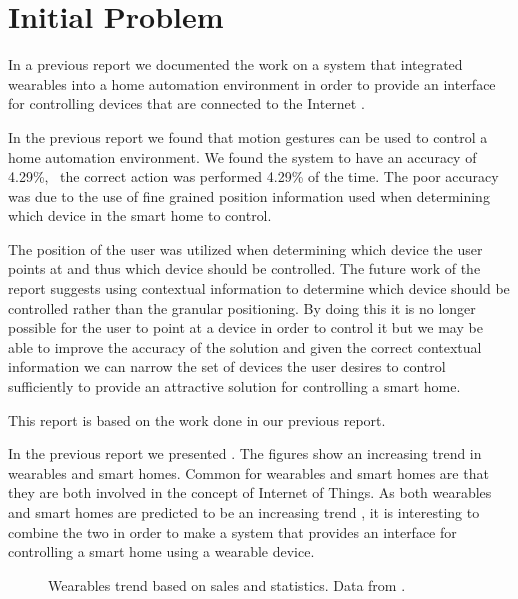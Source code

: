 \section{Initial Problem}
\label{sec:initproblem}

In a previous report we documented the work on a system that integrated wearables into a home automation environment in order to provide an interface for controlling devices that are connected to the Internet \cite{prespecialisation}. 

In the previous report \cite[pp. 69-73]{prespecialisation} we found that motion gestures can be used to control a home automation environment. We found the system to have an accuracy of 4.29\%, \ie~the correct action was performed 4.29\% of the time. The poor accuracy was due to the use of fine grained position information used when determining which device in the smart home to control.

The position of the user was utilized when determining which device the user points at and thus which device should be controlled. The future work of the report \cite[pp. 71-73]{prespecialisation} suggests using contextual information to determine which device should be controlled rather than the granular positioning. By doing this it is no longer possible for the user to point at a device in order to control it but we may be able to improve the accuracy of the solution and given the correct contextual information we can narrow the set of devices the user desires to control sufficiently to provide an attractive solution for controlling a smart home.

This report is based on the work done in our previous report.

In the previous report \cite[pp. 1-4]{prespecialisation} we presented . The figures show an increasing trend in wearables and smart homes. Common for wearables and smart homes are that they are both involved in the concept of Internet of Things. As both wearables and smart homes are predicted to be an increasing trend \cite{WEARABLESTRENDNUMBERS,SMARTHOMETREND}, it is interesting to combine the two in order to make a system that provides an interface for controlling a smart home using a wearable device.

\begin{figure}[!hbt]
  \centering
  
  \caption{Wearables trend based on sales and statistics. Data from \protect\cite{WEARABLESTRENDNUMBERS}.}
  \label{fig:wearables-trend}
\end{figure}

